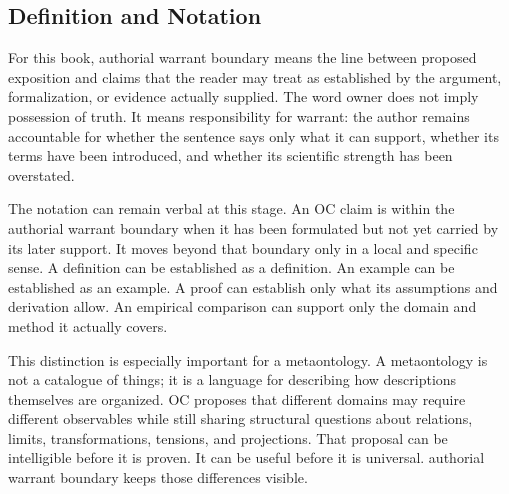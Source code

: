 \documentclass[11pt,a4paper,openany]{book}
\begin{document}
\subsection{Definition and Notation}
For this book, authorial warrant boundary means the line between proposed exposition and claims that the reader may treat as established by the argument, formalization, or evidence actually supplied. The word owner does not imply possession of truth. It means responsibility for warrant: the author remains accountable for whether the sentence says only what it can support, whether its terms have been introduced, and whether its scientific strength has been overstated. \cite{prigogine_dissipative,haken_synergetics}\par
The notation can remain verbal at this stage. An OC claim is within the authorial warrant boundary when it has been formulated but not yet carried by its later support. It moves beyond that boundary only in a local and specific sense. A definition can be established as a definition. An example can be established as an example. A proof can establish only what its assumptions and derivation allow. An empirical comparison can support only the domain and method it actually covers.\par
This distinction is especially important for a metaontology. A metaontology is not a catalogue of things; it is a language for describing how descriptions themselves are organized. OC proposes that different domains may require different observables while still sharing structural questions about relations, limits, transformations, tensions, and projections. That proposal can be intelligible before it is proven. It can be useful before it is universal. authorial warrant boundary keeps those differences visible.\par
\end{document}
